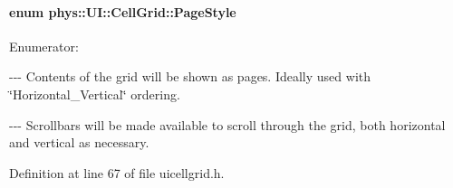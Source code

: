 \hypertarget{classphys_1_1UI_1_1CellGrid_a3644cef16e10c867c233105aae7b4e75}{
\paragraph[{PageStyle}]{\setlength{\rightskip}{0pt plus 5cm}enum {\bf phys::UI::CellGrid::PageStyle}}\hfill}
\label{d8/d59/classphys_1_1UI_1_1CellGrid_a3644cef16e10c867c233105aae7b4e75}
\begin{Desc}
\item[Enumerator: ]\par
\begin{description}
\item[{\em 
\hypertarget{classphys_1_1UI_1_1CellGrid_a3644cef16e10c867c233105aae7b4e75a5cc13206330cf9ed55fb443ff4600c77}{
CG\_\-Paged}
\label{d8/d59/classphys_1_1UI_1_1CellGrid_a3644cef16e10c867c233105aae7b4e75a5cc13206330cf9ed55fb443ff4600c77}
}]-\/-\/-\/ Contents of the grid will be shown as pages. Ideally used with \char`\"{}Horizontal\_\-Vertical\char`\"{} ordering. \item[{\em 
\hypertarget{classphys_1_1UI_1_1CellGrid_a3644cef16e10c867c233105aae7b4e75add8259b571786b4e1976dcdb97a8e9c6}{
CG\_\-Scrolled}
\label{d8/d59/classphys_1_1UI_1_1CellGrid_a3644cef16e10c867c233105aae7b4e75add8259b571786b4e1976dcdb97a8e9c6}
}]-\/-\/-\/ Scrollbars will be made available to scroll through the grid, both horizontal and vertical as necessary. \end{description}
\end{Desc}



Definition at line 67 of file uicellgrid.h.



